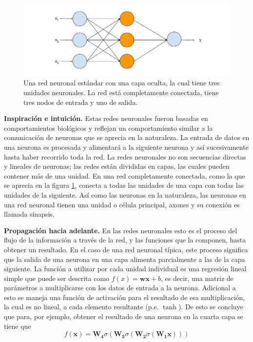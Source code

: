 \begin{figure}
	\includegraphics[scale=.6]{Figures/standardnn.pdf}
	\caption{Una red neuronal estándar con una capa oculta, la cual tiene tres unidades neuronales. La red está completamente conectada, tiene tres nodos de entrada y uno de salida.}
	\label{fig:standardnn}
\end{figure}

\textbf{Inspiración e intuición.} Estas redes neuronales fueron basadas en comportamientos biológicos y reflejan un comportamiento similar a la comunicación de neuronas que se aprecia en la naturaleza. La entrada de datos en una neurona es procesada y alimentará a la siguiente neurona y así sucesivamente hasta haber recorrido toda la red. La redes neuronales no son secuencias directas y lineales de neuronas; las redes están divididas en capas, las cuales pueden contener más de una unidad. En una red completamente conectada, como la que se aprecia en la figura \ref{fig:standardnn}, conecta a todas las unidades de una capa con todas las unidades de la siguiente. Así como las neuronas en la naturaleza, las neuronas en una red neuronal tienen una unidad o célula principal, axones y su conexión es llamada sinapsis.

\textbf{Propagación hacia adelante.} En las redes neuronales esto es el proceso del flujo de la información a través de la red, y las funciones que la componen, hasta obtener un resultado. En el caso de una red neuronal típica, este proceso significa que la salida de una neurona en una capa alimenta parcialmente a las de la capa siguiente. La función a utilizar por cada unidad individual es una regresión lineal simple que puede ser descrita como $f(x) = \mathbf{w} \mathbf{x} + b$, es decir, una matriz de parámetros a multiplicarse con los datos de entrada a la neurona. Adicional a esto se maneja una función de activación para el resultado de esa multiplicación, la cual es no lineal, a cada elemento resultante (p.e. $\tanh$). De esto se concluye que para, por ejemplo, obtener el resultado de una neurona en la cuarta capa se tiene que
\begin{equation}
\label{eq:feedfwdeq}
f(\mathbf{x}) = \mathbf{W_4} \sigma(\mathbf{W_3} \sigma (\mathbf{W_2} \sigma(\mathbf{W_1} \mathbf{x})))
\end{equation}

